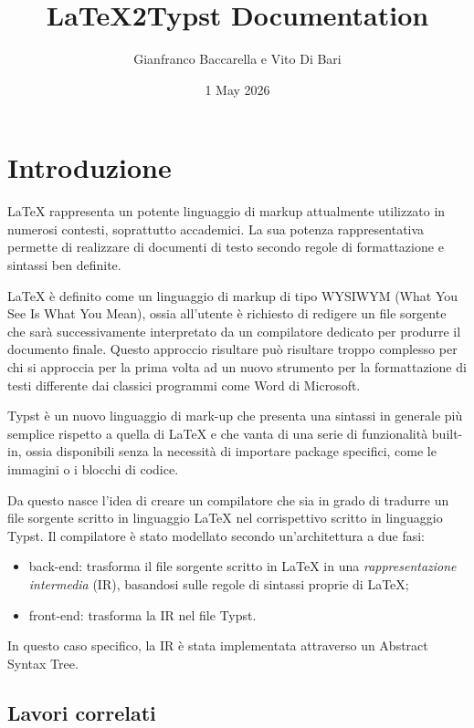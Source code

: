 \documentclass{article}
\title{LaTeX2Typst Documentation}
\author{Gianfranco Baccarella e Vito Di Bari}
\date{1 May 2026}
\begin{document}
    \maketitle
    \tableofcontents

    \section{Introduzione}

    LaTeX rappresenta un potente linguaggio di markup attualmente utilizzato in numerosi contesti, soprattutto accademici.
    La sua potenza rappresentativa permette di realizzare di documenti di testo secondo regole di formattazione e sintassi ben definite.

    LaTeX è definito come un linguaggio di markup di tipo WYSIWYM (What You See Is What You Mean), ossia all'utente è richiesto di redigere un file sorgente che sarà successivamente interpretato da un compilatore dedicato per produrre il documento finale.
    Questo approccio risultare può risultare troppo complesso per chi si approccia per la prima volta ad un nuovo strumento per la formattazione di testi differente dai classici programmi come Word di Microsoft.

    Typst è un nuovo linguaggio di mark-up che presenta una sintassi in generale più semplice rispetto a quella di LaTeX e che vanta di una serie di funzionalità built-in, ossia disponibili senza la necessità di importare package specifici, come le immagini o i blocchi di codice.

    Da questo nasce l'idea di creare un compilatore che sia in grado di tradurre un file sorgente scritto in linguaggio LaTeX nel corrispettivo scritto in linguaggio Typst. Il compilatore è stato modellato secondo un'architettura a due fasi:
    \begin{itemize}
        \item back-end: trasforma il file sorgente scritto in LaTeX in una \textit{rappresentazione intermedia} (IR), basandosi sulle regole di sintassi proprie di LaTeX;
        \item front-end: trasforma la IR nel file Typst.
    \end{itemize}

    In questo caso specifico, la IR è stata implementata attraverso un Abstract Syntax Tree.

    \subsection{Lavori correlati}
\end{document}
